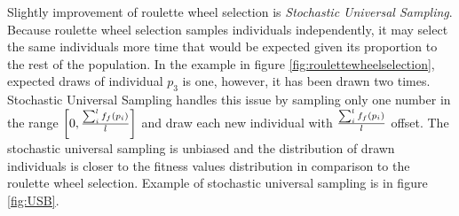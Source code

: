 Slightly improvement of roulette wheel selection is \emph{Stochastic Universal Sampling}. Because roulette wheel selection samples individuals independently, it may select the same individuals more time that would be expected given its proportion to the rest of the population. In the example in figure \ref{fig:roulettewheelselection}, expected draws of individual $p_3$ is one, however, it has been drawn two times. Stochastic Universal Sampling handles this issue by sampling only one number in the range $\left[0,\frac{\sum_i^lf_f(p_i)}{l} \right]$ and draw each new individual with $\frac{\sum_i^lf_f(p_i)}{l}$ offset. The stochastic universal sampling is unbiased and the distribution of drawn individuals is closer to the fitness values distribution in comparison to the roulette wheel selection. Example of stochastic universal sampling is in figure \ref{fig:USB}.

